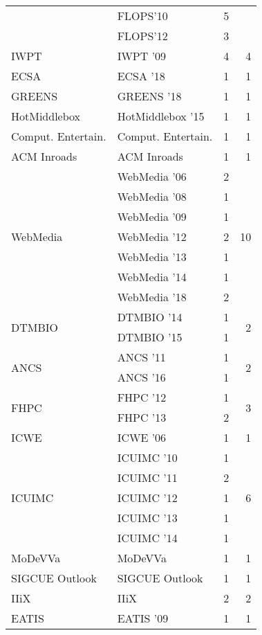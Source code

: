 \begin{table*}[t]
\begin{tabular}{llrr}
& FLOPS'10 & 5 &\\
& FLOPS'12 & 3 &\\
\multirow{1}{*}{IWPT } & IWPT '09 & 4 & \multirow{1}{*}{4}\\
\multirow{1}{*}{ECSA } & ECSA '18 & 1 & \multirow{1}{*}{1}\\
\multirow{1}{*}{GREENS } & GREENS '18 & 1 & \multirow{1}{*}{1}\\
\multirow{1}{*}{HotMiddlebox } & HotMiddlebox '15 & 1 & \multirow{1}{*}{1}\\
\multirow{1}{*}{Comput. Entertain.} & Comput. Entertain. & 1 & \multirow{1}{*}{1}\\
\multirow{1}{*}{ACM Inroads} & ACM Inroads & 1 & \multirow{1}{*}{1}\\
\multirow{7}{*}{WebMedia } & WebMedia '06 & 2 & \multirow{7}{*}{10}\\
& WebMedia '08 & 1 &\\
& WebMedia '09 & 1 &\\
& WebMedia '12 & 2 &\\
& WebMedia '13 & 1 &\\
& WebMedia '14 & 1 &\\
& WebMedia '18 & 2 &\\
\multirow{2}{*}{DTMBIO } & DTMBIO '14 & 1 & \multirow{2}{*}{2}\\
& DTMBIO '15 & 1 &\\
\multirow{2}{*}{ANCS } & ANCS '11 & 1 & \multirow{2}{*}{2}\\
& ANCS '16 & 1 &\\
\multirow{2}{*}{FHPC } & FHPC '12 & 1 & \multirow{2}{*}{3}\\
& FHPC '13 & 2 &\\
\multirow{1}{*}{ICWE } & ICWE '06 & 1 & \multirow{1}{*}{1}\\
\multirow{5}{*}{ICUIMC } & ICUIMC '10 & 1 & \multirow{5}{*}{6}\\
& ICUIMC '11 & 2 &\\
& ICUIMC '12 & 1 &\\
& ICUIMC '13 & 1 &\\
& ICUIMC '14 & 1 &\\
\multirow{1}{*}{MoDeVVa} & MoDeVVa & 1 & \multirow{1}{*}{1}\\
\multirow{1}{*}{SIGCUE Outlook} & SIGCUE Outlook & 1 & \multirow{1}{*}{1}\\
\multirow{1}{*}{IIiX} & IIiX & 2 & \multirow{1}{*}{2}\\
\multirow{1}{*}{EATIS } & EATIS '09 & 1 & \multirow{1}{*}{1}\\

\end{tabular}
\end{table*}
